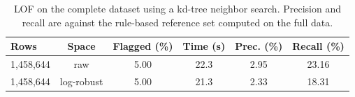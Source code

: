 \begin{table}[!t]
\caption{LOF on the complete dataset using a kd-tree neighbor search. Precision and recall are against the rule-based reference set computed on the full data.}
\label{tab:ext_fulllof}
\centering
\setlength{\tabcolsep}{3pt}
\footnotesize
\begin{tabular}{lccccc}
\hline
Rows & Space & Flagged (\%) & Time (s) & Prec. (\%) & Recall (\%) \\
\hline
1,458,644 & raw & 5.00 & 22.3 & 2.95 & 23.16 \\
1,458,644 & log-robust & 5.00 & 21.3 & 2.33 & 18.31 \\
\hline
\end{tabular}
\end{table}